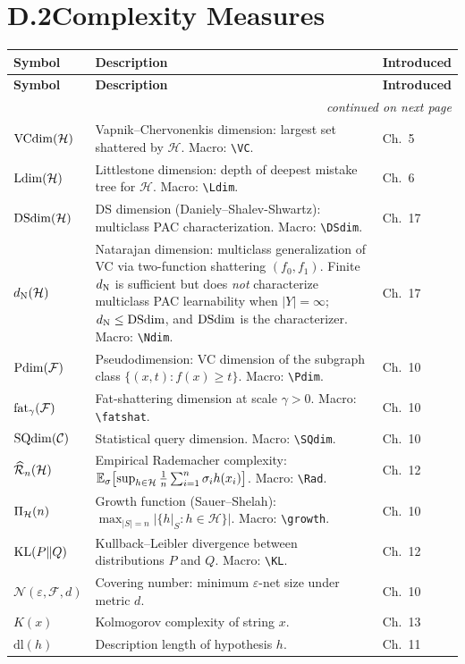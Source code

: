 \section*{D.2\quad Complexity Measures}
\label{sec:notation-complexity}

\begin{longtable}{lp{7.5cm}l}
\toprule
\textbf{Symbol} & \textbf{Description} & \textbf{Introduced} \\
\midrule
\endfirsthead
\toprule
\textbf{Symbol} & \textbf{Description} & \textbf{Introduced} \\
\midrule
\endhead
\midrule
\multicolumn{3}{r}{\footnotesize\itshape continued on next page} \\
\endfoot
\bottomrule
\endlastfoot
$\mathrm{VCdim}(\mathcal{H})$ & Vapnik--Chervonenkis dimension: largest set shattered by $\mathcal{H}$. Macro: \verb|\VC|. & Ch.~5 \\
$\mathrm{Ldim}(\mathcal{H})$ & Littlestone dimension: depth of deepest mistake tree for $\mathcal{H}$. Macro: \verb|\Ldim|. & Ch.~6 \\
$\mathrm{DSdim}(\mathcal{H})$ & DS dimension (Daniely--Shalev-Shwartz): multiclass PAC characterization. Macro: \verb|\DSdim|. & Ch.~17 \\
$d_{\mathrm{N}}(\mathcal{H})$ & Natarajan dimension: multiclass generalization of VC via two-function shattering $(f_0, f_1)$.  Finite $d_{\mathrm{N}}$ is sufficient but does \emph{not} characterize multiclass PAC learnability when $|Y| = \infty$; $d_{\mathrm{N}} \leq \mathrm{DSdim}$, and $\mathrm{DSdim}$ is the characterizer. Macro: \verb|\Ndim|. & Ch.~17 \\
$\mathrm{Pdim}(\mathcal{F})$ & Pseudodimension: VC dimension of the subgraph class $\{(x,t) : f(x) \geq t\}$. Macro: \verb|\Pdim|. & Ch.~10 \\
$\mathrm{fat}_\gamma(\mathcal{F})$ & Fat-shattering dimension at scale $\gamma > 0$. Macro: \verb|\fatshat|. & Ch.~10 \\
$\mathrm{SQdim}(\mathcal{C})$ & Statistical query dimension. Macro: \verb|\SQdim|. & Ch.~10 \\
$\widehat{\mathcal{R}}_n(\mathcal{H})$ & Empirical Rademacher complexity: $\mathbb{E}_\sigma\bigl[\sup_{h \in \mathcal{H}} \frac{1}{n}\sum_{i=1}^n \sigma_i h(x_i)\bigr]$. Macro: \verb|\Rad|. & Ch.~12 \\
$\Pi_\mathcal{H}(n)$ & Growth function (Sauer--Shelah): $\max_{|S|=n} |\{h|_S : h \in \mathcal{H}\}|$. Macro: \verb|\growth|. & Ch.~10 \\
$\mathrm{KL}(P \| Q)$ & Kullback--Leibler divergence between distributions $P$ and $Q$. Macro: \verb|\KL|. & Ch.~12 \\
$\mathcal{N}(\varepsilon, \mathcal{F}, d)$ & Covering number: minimum $\varepsilon$-net size under metric $d$. & Ch.~10 \\
$K(x)$ & Kolmogorov complexity of string $x$. & Ch.~13 \\
$\mathrm{dl}(h)$ & Description length of hypothesis $h$. & Ch.~11 \\
\end{longtable}

